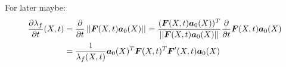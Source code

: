 For later maybe:
\begin{align*}
	\d{\lambda_f}{t}(X,t) &= \d{}{t}\no{\vF(X,t)\va_0(X)} = \frac{(\vF(X,t)\va_0(X))^T}{\no{\vF(X,t)\va_0(X)}}\d{}{t}\vF(X,t)\va_0(X)\\
	  &= \frac{1}{\lambda_f(X,t)}\va_0(X)^T\vF(X,t)^T\vF'(X,t)\va_0(X)
\end{align*}


